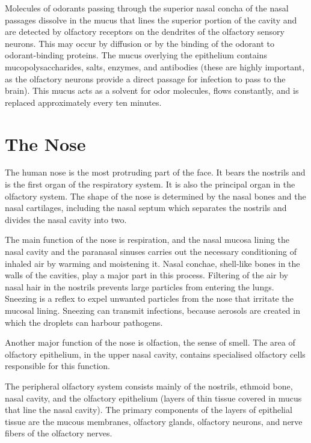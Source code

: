 Molecules of odorants passing through the superior nasal concha of the nasal passages dissolve in the mucus that lines the superior portion of the cavity and are detected by olfactory receptors on the dendrites of the olfactory sensory neurons. This may occur by diffusion or by the binding of the odorant to odorant-binding proteins. The mucus overlying the epithelium contains mucopolysaccharides, salts, enzymes, and antibodies (these are highly important, as the olfactory neurons provide a direct passage for infection to pass to the brain). This mucus acts as a solvent for odor molecules, flows constantly, and is replaced approximately every ten minutes.

\hypertarget{the-nose}{%
\section{The Nose}\label{the-nose}}

The human nose is the most protruding part of the face. It bears the nostrils and is the first organ of the respiratory system. It is also the principal organ in the olfactory system. The shape of the nose is determined by the nasal bones and the nasal cartilages, including the nasal septum which separates the nostrils and divides the nasal cavity into two.

The main function of the nose is respiration, and the nasal mucosa lining the nasal cavity and the paranasal sinuses carries out the necessary conditioning of inhaled air by warming and moistening it. Nasal conchae, shell-like bones in the walls of the cavities, play a major part in this process. Filtering of the air by nasal hair in the nostrils prevents large particles from entering the lungs. Sneezing is a reflex to expel unwanted particles from the nose that irritate the mucosal lining. Sneezing can transmit infections, because aerosols are created in which the droplets can harbour pathogens.

Another major function of the nose is olfaction, the sense of smell. The area of olfactory epithelium, in the upper nasal cavity, contains specialised olfactory cells responsible for this function.

The peripheral olfactory system consists mainly of the nostrils, ethmoid bone, nasal cavity, and the olfactory epithelium (layers of thin tissue covered in mucus that line the nasal cavity). The primary components of the layers of epithelial tissue are the mucous membranes, olfactory glands, olfactory neurons, and nerve fibers of the olfactory nerves.

